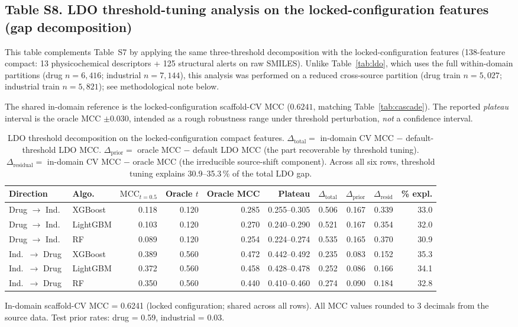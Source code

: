 \subsection*{Table S8. LDO threshold-tuning analysis on the locked-configuration features (gap decomposition)}

This table complements Table~S7 by applying the same three-threshold decomposition with the 
locked-configuration features (138-feature compact: 13 physicochemical descriptors + 125 
structural alerts on raw SMILES). Unlike Table~\ref{tab:ldo}, which uses the full 
within-domain partitions (drug $n=6{,}416$; industrial $n=7{,}144$), this analysis was 
performed on a reduced cross-source partition (drug train $n=5{,}027$; industrial train 
$n=5{,}821$); see methodological note below.

The shared in-domain reference is the locked-configuration scaffold-CV MCC ($0.6241$, 
matching Table~\ref{tab:cascade}). The reported \textit{plateau} interval is the oracle MCC 
$\pm 0.030$, intended as a rough robustness range under threshold perturbation, \textit{not} 
a confidence interval.

\begin{table}[ht]
\caption{LDO threshold decomposition on the locked-configuration compact features. 
$\Delta_{\mathrm{total}} = $ in-domain CV MCC $-$ default-threshold LDO MCC. 
$\Delta_{\mathrm{prior}} = $ oracle MCC $-$ default LDO MCC (the part recoverable by 
threshold tuning). $\Delta_{\mathrm{residual}} = $ in-domain CV MCC $-$ oracle MCC (the 
irreducible source-shift component). Across all six rows, threshold tuning explains 
30.9--35.3\,\% of the total LDO gap.}
\label{tab:ldo_decomp}
\centering
\scriptsize
\setlength{\tabcolsep}{4pt}
\begin{tabular}{@{}llrrrrrrrr@{}}
\toprule
Direction & Algo. & 
$\mathrm{MCC}_{t=0.5}$ & Oracle $t$ & Oracle MCC & Plateau & 
$\Delta_{\mathrm{total}}$ & $\Delta_{\mathrm{prior}}$ & $\Delta_{\mathrm{resid}}$ & \% expl. \\
\midrule
Drug $\to$ Ind.\ & XGBoost  & 0.118 & 0.120 & 0.285 & 0.255--0.305 & 0.506 & 0.167 & 0.339 & 33.0 \\
Drug $\to$ Ind.\ & LightGBM & 0.103 & 0.120 & 0.270 & 0.240--0.290 & 0.521 & 0.167 & 0.354 & 32.0 \\
Drug $\to$ Ind.\ & RF       & 0.089 & 0.120 & 0.254 & 0.224--0.274 & 0.535 & 0.165 & 0.370 & 30.9 \\
Ind.\ $\to$ Drug & XGBoost  & 0.389 & 0.560 & 0.472 & 0.442--0.492 & 0.235 & 0.083 & 0.152 & 35.3 \\
Ind.\ $\to$ Drug & LightGBM & 0.372 & 0.560 & 0.458 & 0.428--0.478 & 0.252 & 0.086 & 0.166 & 34.1 \\
Ind.\ $\to$ Drug & RF       & 0.350 & 0.560 & 0.440 & 0.410--0.460 & 0.274 & 0.090 & 0.184 & 32.8 \\
\bottomrule
\end{tabular}

\medskip
\footnotesize
In-domain scaffold-CV MCC = 0.6241 (locked configuration; shared across all rows). All MCC values 
rounded to 3 decimals from the source data. Test prior rates: drug = 0.59, industrial = 0.03.
\end{table}

